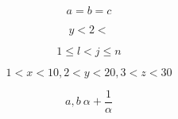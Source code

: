 \documentclass{article}
\begin{document}
\[ a=b=c \]

\[ y<2< \]

\[ 1 \leq l < j \leq n \]

\[ 1<x<10, 2<y<20, 3<z<30\]

\[ a,b ~ \alpha + \frac{1}{\alpha}\]
\end{document}
